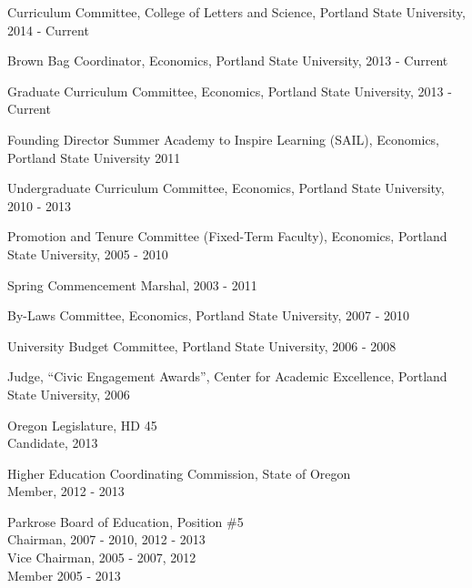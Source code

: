 \documentclass[Computer Science]{vita}
\begin{document}
\begin{vita}
\begin{Professional and Service Activities}
    \begin{University}
    
    \item Curriculum Committee, College of Letters and Science, Portland State University, 2014 - Current
    
    \item Brown Bag Coordinator, Economics, Portland State University, 2013 - Current
    
    \item Graduate Curriculum Committee, Economics, Portland State University, 2013 - Current

\item Founding Director Summer Academy to Inspire Learning (SAIL), Economics, Portland State University 2011

    \item Undergraduate Curriculum Committee, Economics, Portland
      State University, 2010 - 2013

    \item Promotion and Tenure Committee (Fixed-Term Faculty),
      Economics, Portland State University, 2005 - 2010

    \item Spring Commencement Marshal, 2003 - 2011
  
    \item By-Laws Committee, Economics, Portland State University,
      2007 - 2010

    \item University Budget Committee, Portland State University, 2006
      - 2008

    \item Judge, ``Civic Engagement Awards'', Center for Academic
      Excellence, Portland State University, 2006

    \end{University}

    \begin{Community}
\item Oregon Legislature, HD 45\\ Candidate, 2013

\item Higher Education Coordinating Commission, State of Oregon\\
Member, 2012 - 2013

    \item Parkrose Board of Education, Position \#5\\
      Chairman, 2007 - 2010, 2012 - 2013\\
      Vice Chairman, 2005 - 2007, 2012 \\
      Member 2005 - 2013


\end{Community}
\end{Professional and Service Activities}
\end{vita}
\end{document}
